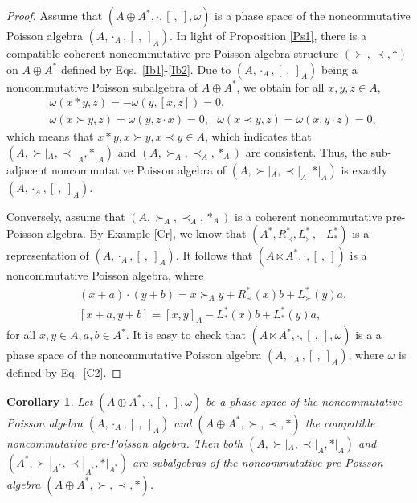 \documentclass[12pt]{amsart}
\newtheorem{cor}[thm]{Corollary}
\theoremstyle{definition}
\begin{document}
\begin{proof} Assume that $(A\oplus A^{*},\cdot, [ \ , \ ],\omega)$ is a phase space of
 the noncommutative Poisson algebra $(A,\cdot_A,[ \ , \ ]_A)$.
 In light of Proposition \ref{Ps1}, there is a compatible coherent noncommutative
  pre-Poisson algebra structure $(\succ,\prec,\ast)$ on $A\oplus A^{*}$ defined by Eqs.~\eqref{Ib1}-\eqref{Ib2}.
Due to $(A,\cdot_A,[ \ , \ ]_A)$ being a noncommutative Poisson subalgebra of $A\oplus A^{*}$, we obtain for all $x,y,z\in A$,
 \begin{align*}&
    \omega(x\ast y,z)=-\omega(y,[x,z])=0,\\&
  \omega(x\succ y,z)=\omega(y,z\cdot x)=0 ,\ \ \ 
    \omega(x\prec y,z)=\omega(x,y\cdot z)=0,
  \end{align*}
which means that $x\ast y,x\succ y,x\prec y\in A$, which indicates that
 $(A,\succ|_{A},\prec|_{A},\ast|_{A})$ and $(A,\succ_A,\prec_A,\ast_A)$ are consistent. Thus, the
 sub-adjacent noncommutative Poisson algebra of $(A,\succ|_{A},\prec|_{A},\ast|_{A})$ is exactly $(A,\cdot_A,[ \ , \ ]_A)$.
 
Conversely, assume that $(A,\succ_A,\prec_A, \ast_A)$ is a coherent noncommutative pre-Poisson algebra. 
By Example \ref{Cr}, we know that $(A^{*},R_{\prec}^{*}, L_{\succ}^{*},-L_{\ast}^{*})$ is a representation of $(A,\cdot_A, [ \ , \ ]_A)$.
 It follows that $(A\ltimes A^{*},\cdot,[ \ , \ ])$ is a noncommutative Poisson algebra,
 where 
 \begin{align*}&
 (x+a)\cdot (y+b)=x\succ_A y+R_{\prec}^{*}(x)b+L_{\succ}^{*}(y)a,\\&
 [x+a, y+b]=[x,y]_A -L_{\ast}^{*}(x)b+L_{\ast}^{*}(y)a, 
  \end{align*} 
  for all $x,y\in A,a,b\in A^{*}$.
 It is easy to check that $(A\ltimes A^{*},\cdot,[ \ , \ ],\omega)$ is a
   a phase space of the noncommutative Poisson algebra $(A,\cdot_A,[ \ , \ ]_A)$, where $\omega$ is defined by Eq.~\eqref{C2}.
\end{proof}

\begin{cor} \label{Ps3} Let $(A\oplus A^{*},\cdot, [ \ , \ ],\omega)$ be a phase space of
 the noncommutative Poisson algebra $(A,\cdot_A,[ \ , \ ]_A)$
and $(A\oplus A^{*},\succ,\prec,\ast)$ the compatible noncommutative pre-Poisson algebra. Then both 
$(A,\succ|_{A},\prec|_{A},\ast|_{A})$ and $(A^{*},\succ|_{A^{*}},\prec|_{A^{*}},\ast|_{A^{*}})$
are subalgebras of the noncommutative pre-Poisson algebra $(A\oplus A^{*},\succ,\prec,\ast)$.
\end{cor}
\end{document}
